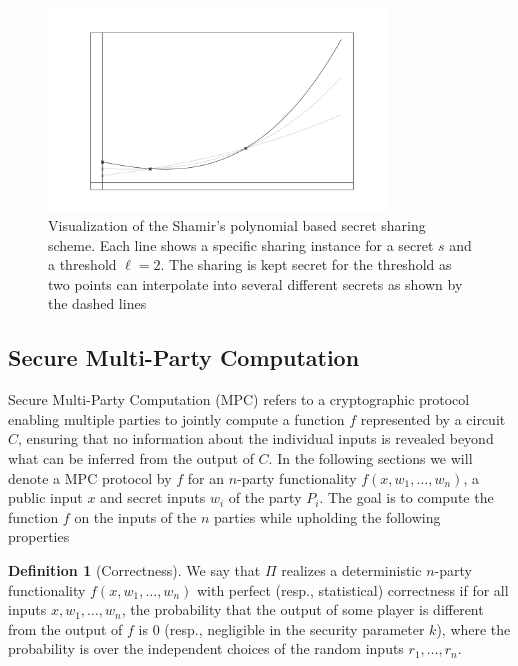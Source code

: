 \documentclass[11pt]{report}
\theoremstyle{definition}
\newtheorem{definition}{Definition}[section]
\theoremstyle{plain}
\begin{document}
\begin{figure}
  \centering
  \includegraphics[width=0.8\textwidth]{images/shamir.png}
  \caption{Visualization of the Shamir's polynomial based secret sharing scheme. Each line shows a specific sharing instance for a secret $s$ and a threshold $\ell=2$. The sharing is kept secret for the threshold as two points can interpolate into several different secrets as shown by the dashed lines}\label{fig:shamir}
\end{figure}

\subsection{Secure Multi-Party Computation}\label{sec:mpc}

Secure Multi-Party Computation (MPC) refers to a cryptographic protocol enabling multiple parties to jointly compute a function $f$ represented by a circuit $C$, ensuring that no information about the individual inputs is revealed beyond what can be inferred from the output of $C$. In the following sections we will denote a MPC protocol by $f$ for an $n$-party functionality $f(x, w_1, \dots, w_n)$, a public input $x$ and secret inputs $w_i$ of the party $P_i$. The goal is to compute the function $f$ on the inputs of the $n$ parties while upholding the following properties~\cite{cramer2015secure}

\begin{definition}[Correctness]\label{def:mpc-correctness}
  We say that $\Pi$ realizes a deterministic $n$-party functionality $f(x, w_1, \dots, w_n)$ with perfect (resp., statistical) correctness if for all inputs $x, w_1, \dots, w_n$, the probability that the output of some player is different from the output of $f$ is $0$ (resp., negligible in the security parameter $k$), where the probability is over the independent choices of the random inputs $r_1, \dots, r_n$.
\end{definition}
\end{document}
